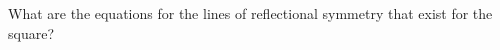 \documentclass{ximera}
\author{Jenny Sheldon \and Bart Snapp}
\begin{document}
\makerandom



\begin{exercise}
   What are the equations for the lines of reflectional symmetry that exist for the square?
      \begin{prompt}
    \begin{multipleChoice}
    \end{multipleChoice}
  \end{prompt}

\end{exercise}
\end{document}
